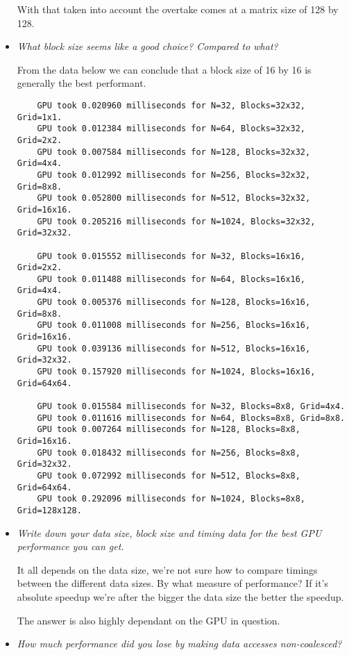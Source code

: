 \documentclass[a4paper,12pt]{article}
\begin{document}
\begin{itemize}
  With that taken into account the overtake comes at a matrix size of 128 by 128.

\item \textit{What block size seems like a good choice? Compared to what?}

  From the data below we can conclude that a block size of 16 by 16 is generally the best performant.

  \begin{lstlisting}
    GPU took 0.020960 milliseconds for N=32, Blocks=32x32, Grid=1x1.
    GPU took 0.012384 milliseconds for N=64, Blocks=32x32, Grid=2x2.
    GPU took 0.007584 milliseconds for N=128, Blocks=32x32, Grid=4x4.
    GPU took 0.012992 milliseconds for N=256, Blocks=32x32, Grid=8x8.
    GPU took 0.052800 milliseconds for N=512, Blocks=32x32, Grid=16x16.
    GPU took 0.205216 milliseconds for N=1024, Blocks=32x32, Grid=32x32.

    GPU took 0.015552 milliseconds for N=32, Blocks=16x16, Grid=2x2.
    GPU took 0.011488 milliseconds for N=64, Blocks=16x16, Grid=4x4.
    GPU took 0.005376 milliseconds for N=128, Blocks=16x16, Grid=8x8.
    GPU took 0.011008 milliseconds for N=256, Blocks=16x16, Grid=16x16.
    GPU took 0.039136 milliseconds for N=512, Blocks=16x16, Grid=32x32.
    GPU took 0.157920 milliseconds for N=1024, Blocks=16x16, Grid=64x64.

    GPU took 0.015584 milliseconds for N=32, Blocks=8x8, Grid=4x4.
    GPU took 0.011616 milliseconds for N=64, Blocks=8x8, Grid=8x8.
    GPU took 0.007264 milliseconds for N=128, Blocks=8x8, Grid=16x16.
    GPU took 0.018432 milliseconds for N=256, Blocks=8x8, Grid=32x32.
    GPU took 0.072992 milliseconds for N=512, Blocks=8x8, Grid=64x64.
    GPU took 0.292096 milliseconds for N=1024, Blocks=8x8, Grid=128x128.
  \end{lstlisting}


\item \textit{Write down your data size, block size and timing data for the best GPU performance you can get.}

  It all depends on the data size, we're not sure how to compare timings between the different data sizes. By what measure of performance? If it's absolute speedup we're after the bigger the data size the better the speedup.

  The answer is also highly dependant on the GPU in question.


\item \textit{How much performance did you lose by making data accesses non-coalesced?}


\end{itemize}
\end{document}
